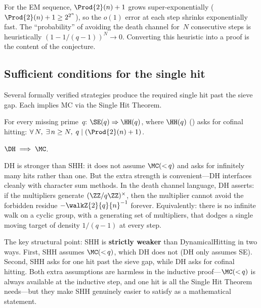 For the EM sequence, $\Prod{2}(n)+1$ grows super-exponentially
($\Prod{2}(n)+1 \geq 2^{2^n}$), so the $o(1)$ error at each step
shrinks exponentially fast.  The ``probability'' of avoiding the death
channel for~$N$ consecutive steps is heuristically
$(1 - 1/(q-1))^N \to 0$.  Converting this heuristic into a proof is
the content of the conjecture.

\subsection{Sufficient conditions for the single hit}
\label{sec:sufficient-conditions}

Several formally verified strategies produce the required single hit
past the sieve gap.  Each implies MC via the Single Hit Theorem.

\begin{property}\label{def:dh}\label{def:hh}
For every missing prime~$q$: $\SE(q) \Rightarrow \HH(q)$, where
$\HH(q)$ () asks for cofinal hitting:
$\forall\, N,\; \exists\, n \geq N,\; q \mid (\Prod{2}(n) + 1)$.
\end{property}

\begin{theorem}
\label{thm:dh-mc}
$\DH \;\Longrightarrow\; \MC$.
\end{theorem}

DH is stronger than SHH: it does not assume $\MC({<}\,q)$ and asks for
infinitely many hits rather than one.  But the extra strength is
convenient---DH interfaces cleanly with character sum methods.
In the death channel language, DH asserts: if the multipliers generate
$(\ZZ/q\ZZ)^\times$, then the multiplier cannot avoid the forbidden
residue $-\walkZ{2}{q}{n}^{-1}$ forever.  Equivalently: there is no
infinite walk on a cyclic group, with a generating set of multipliers,
that dodges a single moving target of density $1/(q-1)$ at every step.

The key structural point: SHH is \textbf{strictly weaker} than
DynamicalHitting in two ways.
First, SHH assumes $\MC({<}\,q)$, which DH does not (DH only assumes SE).
Second, SHH asks for one hit past the sieve gap, while DH asks for
cofinal hitting.  Both extra assumptions are harmless in the inductive
proof---$\MC({<}\,q)$ is always available at the inductive step, and
one hit is all the Single Hit Theorem needs---but they make SHH
genuinely easier to satisfy as a mathematical statement.

